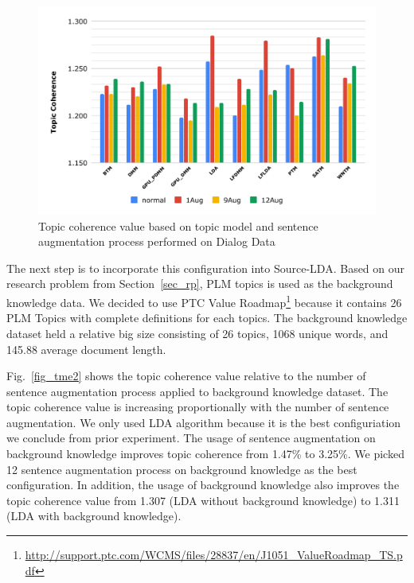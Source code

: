 \documentclass[10pt, conference, compsocconf]{IEEEtran}
\begin{document}
\begin{figure}[b]
	\includegraphics[scale=0.425]{new-topic1.pdf}
	\caption{Topic coherence value based on topic model and sentence augmentation process performed on Dialog Data}
\label{fig_tme}
\end{figure}

The next step is to incorporate this configuration into  Source-LDA. Based on our research problem from Section~\ref{sec_rp}, PLM topics is used as the background knowledge data. We decided to use PTC Value Roadmap\footnote{\url{http://support.ptc.com/WCMS/files/28837/en/J1051_ValueRoadmap_TS.pdf}} because it contains 26 PLM Topics with complete definitions for each topics. The background knowledge dataset held a relative big size consisting of 26 topics, 1068 unique words, and 145.88 average document length. 

Fig.~\ref{fig_tme2} shows the topic coherence value relative to the number of sentence augmentation process applied to background knowledge dataset. The topic coherence value is increasing proportionally with the number of sentence augmentation. We only used LDA algorithm because it is the best configuriation we conclude from prior experiment. The usage of sentence augmentation on background knowledge improves topic coherence from 1.47\% to 3.25\%. We picked 12 sentence augmentation process on background knowledge as the best configuration. In addition, the usage of background knowledge also improves the topic coherence value from 1.307 (LDA without background knowledge) to 1.311 (LDA with background knowledge).
\end{document}
